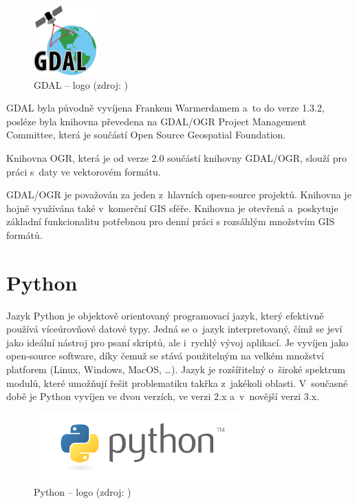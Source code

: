 \documentclass[a4paper,12pt,oneside]{book}
\begin{document}
\begin{figure}[h]
\centering
\includegraphics[scale=1]{images/gdal-logo.png}
\caption[GDAL -- logo]{GDAL -- logo (zdroj: \cite{gdal})}
\end{figure}

GDAL byla původně vyvíjena Frankem Warmerdamem a~to do verze 1.3.2, posléze byla knihovna převedena na GDAL/OGR Project Management Committee, která je součástí Open Source Geospatial Foundation.\cite{gdal_wiki}

Knihovna OGR, která je od verze 2.0 součástí knihovny GDAL/OGR, slouží pro práci s~daty ve vektorovém formátu.\cite{gdal}

GDAL/OGR je považován za jeden z~hlavních open-source projektů. Knihovna je hojně využívána také v~komerční GIS sféře. Knihovna je otevřená a~poskytuje základní funkcionalitu potřebnou pro denní práci s rozsáhlým množstvím GIS formátů.\cite{gdal_wiki}


\section{Python}

Jazyk Python je objektově orientovaný programovací jazyk, který efektivně používá víceúrovňové datové typy. Jedná se o~jazyk interpretovaný, čímž se jeví jako ideální nástroj pro psaní skriptů, ale i~rychlý vývoj aplikací. Je vyvíjen jako open-source software, díky čemuž se stává použitelným na velkém množství platforem (Linux, Windows, MacOS, \dots). Jazyk je rozšířitelný o~široké spektrum modulů, které umožňují řešit problematiku takřka z~jakékoli oblasti. V~současné době je Python vyvíjen ve dvou verzích, ve verzi 2.x a~v~novější verzi 3.x.
\cite{dive_into_python}
\cite{python_web}

\begin{figure}[htb]
\centering
\includegraphics[scale=1]{images/python-logo.png}
\caption[Python -- logo]{Python -- logo (zdroj: \cite{python_web})}
\end{figure}
\end{document}
